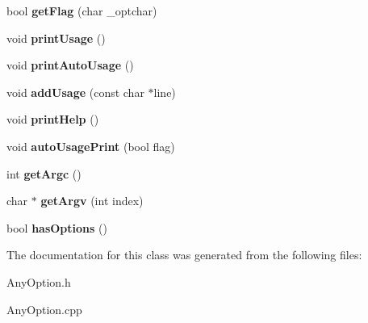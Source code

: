 \begin{DoxyCompactItemize}
\item 
bool {\bfseries get\+Flag} (char \+\_\+optchar)\hypertarget{class_any_option_a955d685485036fabc3cedde66f441978}{}\label{class_any_option_a955d685485036fabc3cedde66f441978}

\item 
void {\bfseries print\+Usage} ()\hypertarget{class_any_option_a27d72b5ea4ab75eaeb74207b2165b1fe}{}\label{class_any_option_a27d72b5ea4ab75eaeb74207b2165b1fe}

\item 
void {\bfseries print\+Auto\+Usage} ()\hypertarget{class_any_option_a531b07829ead5a4a292ff2f0b3be8f9a}{}\label{class_any_option_a531b07829ead5a4a292ff2f0b3be8f9a}

\item 
void {\bfseries add\+Usage} (const char $\ast$line)\hypertarget{class_any_option_ad0c5643f303324e20754455d58ff2ff0}{}\label{class_any_option_ad0c5643f303324e20754455d58ff2ff0}

\item 
void {\bfseries print\+Help} ()\hypertarget{class_any_option_ad10117aa56fe321efbbf0b90bc6ca124}{}\label{class_any_option_ad10117aa56fe321efbbf0b90bc6ca124}

\item 
void {\bfseries auto\+Usage\+Print} (bool flag)\hypertarget{class_any_option_ab41d990eb6cbe95fbab17e4f961fb365}{}\label{class_any_option_ab41d990eb6cbe95fbab17e4f961fb365}

\item 
int {\bfseries get\+Argc} ()\hypertarget{class_any_option_a59fd57b36dc2626d49926e7424d5b695}{}\label{class_any_option_a59fd57b36dc2626d49926e7424d5b695}

\item 
char $\ast$ {\bfseries get\+Argv} (int index)\hypertarget{class_any_option_acd1e384bfe595be9e4b8cd27cf400643}{}\label{class_any_option_acd1e384bfe595be9e4b8cd27cf400643}

\item 
bool {\bfseries has\+Options} ()\hypertarget{class_any_option_aefa633ab31303cbe67bc6b3b501649f4}{}\label{class_any_option_aefa633ab31303cbe67bc6b3b501649f4}

\end{DoxyCompactItemize}


The documentation for this class was generated from the following files\+:\begin{DoxyCompactItemize}
\item 
Any\+Option.\+h\item 
Any\+Option.\+cpp\end{DoxyCompactItemize}

